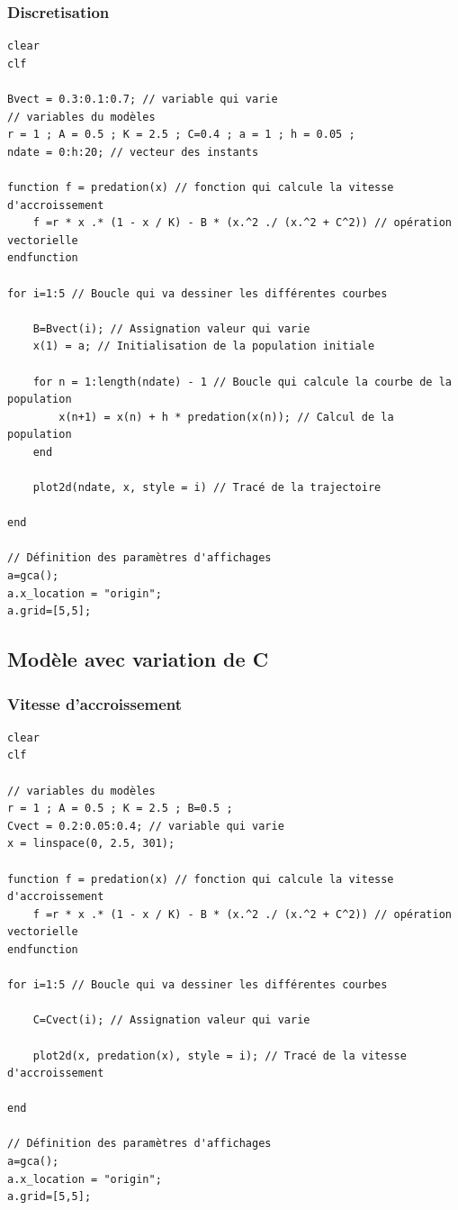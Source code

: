 \documentclass{article}
\begin{document}
\subsubsection{Discretisation}

\begin{verbatim}
clear
clf

Bvect = 0.3:0.1:0.7; // variable qui varie
// variables du modèles
r = 1 ; A = 0.5 ; K = 2.5 ; C=0.4 ; a = 1 ; h = 0.05 ;
ndate = 0:h:20; // vecteur des instants

function f = predation(x) // fonction qui calcule la vitesse d'accroissement
    f =r * x .* (1 - x / K) - B * (x.^2 ./ (x.^2 + C^2)) // opération vectorielle
endfunction

for i=1:5 // Boucle qui va dessiner les différentes courbes
    
    B=Bvect(i); // Assignation valeur qui varie
    x(1) = a; // Initialisation de la population initiale
    
    for n = 1:length(ndate) - 1 // Boucle qui calcule la courbe de la population
        x(n+1) = x(n) + h * predation(x(n)); // Calcul de la population
    end
    
    plot2d(ndate, x, style = i) // Tracé de la trajectoire

end

// Définition des paramètres d'affichages
a=gca();
a.x_location = "origin";
a.grid=[5,5];
\end{verbatim}


\subsection{Modèle avec variation de C}

\subsubsection{Vitesse d'accroissement}

\begin{verbatim}
clear
clf

// variables du modèles
r = 1 ; A = 0.5 ; K = 2.5 ; B=0.5 ;
Cvect = 0.2:0.05:0.4; // variable qui varie
x = linspace(0, 2.5, 301);

function f = predation(x) // fonction qui calcule la vitesse d'accroissement
    f =r * x .* (1 - x / K) - B * (x.^2 ./ (x.^2 + C^2)) // opération vectorielle
endfunction

for i=1:5 // Boucle qui va dessiner les différentes courbes
 
    C=Cvect(i); // Assignation valeur qui varie

    plot2d(x, predation(x), style = i); // Tracé de la vitesse d'accroissement

end

// Définition des paramètres d'affichages
a=gca();
a.x_location = "origin";
a.grid=[5,5];
\end{verbatim}
\end{document}
